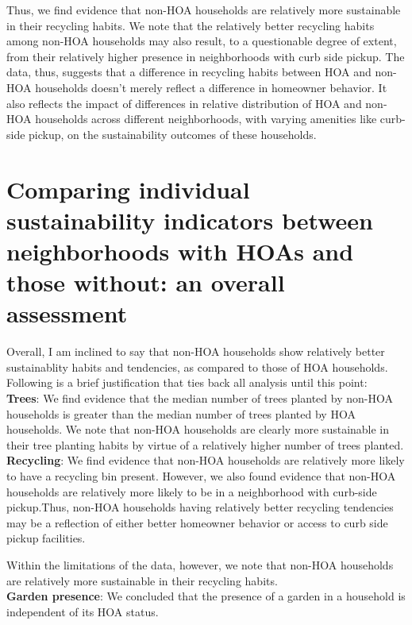 \documentclass{article}
\begin{document}
Thus, we find evidence that non-HOA households are relatively more sustainable in their recycling habits. We note that the relatively better recycling habits among non-HOA households may also result, to a questionable degree of extent, from their relatively higher presence in neighborhoods with curb side pickup. The data, thus, suggests that a difference in recycling habits between HOA and non-HOA households doesn't merely reflect a difference in homeowner behavior. It also reflects the impact of differences in relative distribution of HOA and non-HOA households across different neighborhoods, with varying amenities like curb-side pickup, on the sustainability outcomes of these households.\\

\section*{Comparing individual sustainability indicators between neighborhoods with HOAs and those without: an overall assessment}

Overall, I am inclined to say that non-HOA households show relatively better sustainablity habits and tendencies, as compared to those of HOA households. Following is a brief justification that ties back all analysis until this point: \\

\textbf{Trees}: We find evidence that the median number of trees planted by non-HOA households is greater than the median number of trees planted by HOA households. We note that non-HOA households are clearly more sustainable in their tree planting habits by virtue of a relatively higher number of trees planted.\\

\textbf{Recycling}: We find evidence that non-HOA households are relatively more likely to have a recycling bin present. However, we also found evidence that non-HOA households are relatively more likely to be in a neighborhood with curb-side pickup.Thus, non-HOA households having relatively better recycling tendencies may be a reflection of either better homeowner behavior or access to curb side pickup facilities. 

Within the limitations of the data, however, we note that non-HOA households are relatively more sustainable in their recycling habits.\\

\textbf{Garden presence}: We concluded that the presence of a garden in a household is independent of its HOA status.\\
\end{document}
